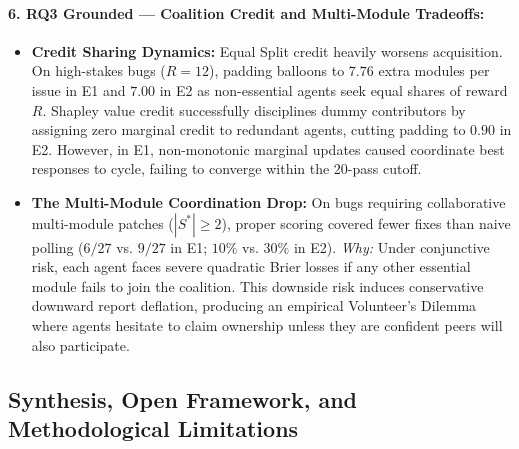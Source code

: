 \documentclass{article}
\theoremstyle{definition}
\begin{document}
\paragraph{6. RQ3 Grounded — Coalition Credit and Multi-Module Tradeoffs:}
\begin{itemize}
    \item \textbf{Credit Sharing Dynamics:} Equal Split credit heavily worsens acquisition. On high-stakes bugs ($R = 12$), padding balloons to $7.76$ extra modules per issue in E1 and $7.00$ in E2 as non-essential agents seek equal shares of reward $R$. Shapley value credit successfully disciplines dummy contributors by assigning zero marginal credit to redundant agents, cutting padding to $0.90$ in E2. However, in E1, non-monotonic marginal updates caused coordinate best responses to cycle, failing to converge within the 20-pass cutoff.
    \item \textbf{The Multi-Module Coordination Drop:} On bugs requiring collaborative multi-module patches ($|S^*| \ge 2$), proper scoring covered fewer fixes than naive polling ($6/27$ vs. $9/27$ in E1; $10\%$ vs. $30\%$ in E2).
    \emph{Why:} Under conjunctive risk, each agent faces severe quadratic Brier losses if any other essential module fails to join the coalition. This downside risk induces conservative downward report deflation, producing an empirical Volunteer's Dilemma where agents hesitate to claim ownership unless they are confident peers will also participate.
\end{itemize}

\subsection{Synthesis, Open Framework, and Methodological Limitations}
\label{subsec:synthesis_limitations}
\end{document}
